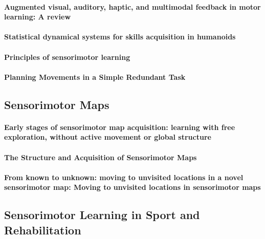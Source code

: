 \documentclass[11pt]{article}
\begin{document}
\paragraph{Augmented visual, auditory, haptic, and multimodal feedback in motor learning: A review} \citep{sigrist_augmented_2013}

\paragraph{Statistical dynamical systems for skills acquisition in humanoids} \citep{calinon_statistical_2012}

\paragraph{Principles of sensorimotor learning} \citep{wolpert_principles_2011}

\paragraph{Planning Movements in a Simple Redundant Task} \citep{vetter_planning_2002}


\subsection{Sensorimotor Maps}
\paragraph{Early stages of sensorimotor map acquisition: learning with free exploration, without active movement or global structure} \citep{van_vugt_early_2019}

\paragraph{The Structure and Acquisition of Sensorimotor Maps} \citep{van_vugt_structure_2018}

\paragraph{From known to unknown: moving to unvisited locations in a novel sensorimotor map: Moving to unvisited locations in sensorimotor maps} \citep{van_vugt_known_2018}


\subsection{Sensorimotor Learning in Sport and Rehabilitation}
\end{document}
